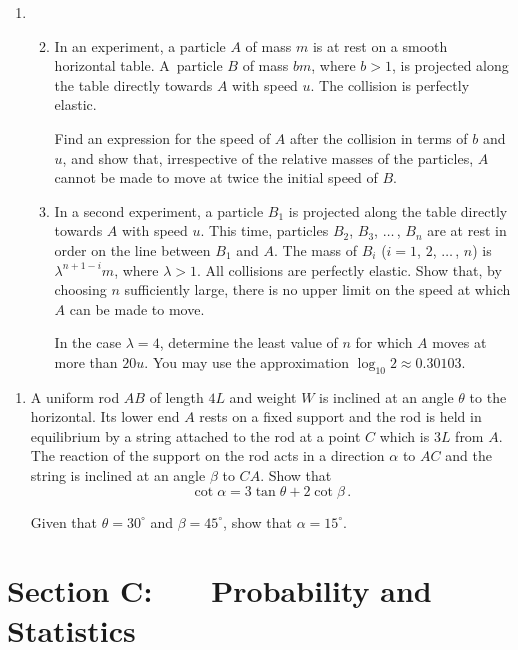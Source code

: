 \documentclass[a4, 11pt]{report}
\newlength{\qspace}
\newcounter{qnumber}
\newenvironment{question}%
 {\vspace{\qspace}
  \begin{enumerate}[\bfseries 1\quad][10]%
    \setcounter{enumi}{\value{qnumber}}%
    \item%
 }
{
  \end{enumerate}
  \filbreak
  \stepcounter{qnumber}
 }
\newenvironment{questionparts}[1][1]%
 {
  \begin{enumerate}[\bfseries (i)]%
    \setcounter{enumii}{#1}
    \addtocounter{enumii}{-1}
    \setlength{\itemsep}{5mm}
    \setlength{\parskip}{8pt}
 }
 {
  \end{enumerate}
 }
\begin{document}
\begin{question}	
\begin{questionparts}
\item
In an experiment,
a particle $A$ of mass $m$ is at rest on a smooth horizontal table.
A~particle $B$ of mass $bm$, where $b>1$, is projected along the 
table directly towards $A$ with speed $u$. The collision is perfectly 
elastic. 


Find an expression for the speed of $A$ after the collision
  in terms of $b$ and $u$, and 
show that, irrespective of the relative masses of the particles, 
$A$ cannot be made to move at twice the initial speed of $B$. 

\item 
In a second experiment, a particle $B_1$ 
 is  projected along the table directly towards $A$ with speed $u$. This time, 
particles $B_2$, $B_3$, $\ldots\,$, $B_n$ are at rest in order 
on the line between $B_1$ and $A$.
The mass of $B_i$ ($i=1$, $2$, $\ldots\,$, $n$)
is $\lambda^{n+1-i}m$, where $\lambda>1$.
All collisions are perfectly elastic. Show that, by choosing $n$ sufficiently
large, there is no upper limit on the speed at which $A$ can be made to move.

In the case $\lambda=4$,
determine the least value of 
$n$ for which  $A$ moves at more than $20u$. You may use the 
approximation
 $\log_{10}2 \approx 0.30103$.

\end{questionparts}
\end{question}


\begin{question}
A uniform rod $AB$ of length $4L   $ and
weight $W$ is inclined at an angle $\theta$ to the 
horizontal. Its lower end $A$ rests on a fixed support and the rod is held
in equilibrium by a string 
attached to the rod at a point $C$ which is $3L   $ from $A$.
The reaction of the support on the rod acts in a direction $\alpha$ to 
$AC$  and the string is inclined at an angle $\beta$ to $CA$.
Show that
\[
\cot\alpha = 3\tan \theta + 2 \cot \beta\,.
\]

Given that 
$\theta =30^\circ$ and $\beta = 45^\circ$,
show that $\alpha= 15^\circ$.
\end{question}
	

	
	\newpage
\section*{Section C: \ \ \ Probability and Statistics}
\end{document}
